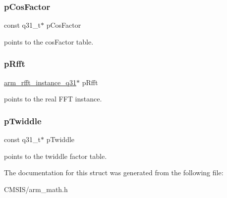 \subsubsection{\texorpdfstring{pCosFactor}{pCosFactor}}
{\footnotesize\ttfamily const q31\+\_\+t$\ast$ p\+Cos\+Factor}

points to the cos\+Factor table. \mbox{\label{structarm__dct4__instance__q31_a16c74f8496e1691e62da3c57e0c676eb}} 
\subsubsection{\texorpdfstring{pRfft}{pRfft}}
{\footnotesize\ttfamily \mbox{\hyperlink{structarm__rfft__instance__q31}{arm\+\_\+rfft\+\_\+instance\+\_\+q31}}$\ast$ p\+Rfft}

points to the real F\+FT instance. \mbox{\label{structarm__dct4__instance__q31_a9760c603af5d85652496dbffd63a8a2e}} 
\subsubsection{\texorpdfstring{pTwiddle}{pTwiddle}}
{\footnotesize\ttfamily const q31\+\_\+t$\ast$ p\+Twiddle}

points to the twiddle factor table. 

The documentation for this struct was generated from the following file\+:\begin{DoxyCompactItemize}
\item 
C\+M\+S\+I\+S/arm\+\_\+math.\+h\end{DoxyCompactItemize}
